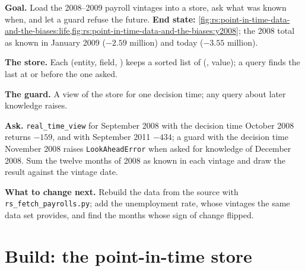\begin{tutorial}
\textbf{Goal.} Load the 2008--2009 payroll vintages into a  store, ask what was known when, and let a guard refuse
the future. \textbf{End state:} \cref{fig:rs:point-in-time-data-and-the-biases:life,fig:rs:point-in-time-data-and-the-biases:y2008};
the 2008 total as known in January 2009 ($-2.59$ million) and today ($-3.55$ million).
\begin{tutsteps}
\item \textbf{The store.} Each (entity, field, ) keeps a sorted list of (, value); a query finds the
last  at or before the one asked.
\label{lst:rs:point-in-time-data-and-the-biases:store}
\item \textbf{The guard.} A view of the store for one decision time; any query about later knowledge raises.
\label{lst:rs:point-in-time-data-and-the-biases:guard}
\item \textbf{Ask.} \texttt{real\_time\_view} for September 2008 with the decision time October 2008 returns $-159$, and with
September 2011 $-434$; a guard with the decision time November 2008 raises \texttt{LookAheadError} when asked for knowledge of
December 2008. Sum the twelve months of 2008 as known in each vintage and draw the result against the vintage date.
\end{tutsteps}
\textbf{What to change next.} Rebuild the data from the source with \texttt{rs\_fetch\_payrolls.py}; add the unemployment rate,
whose vintages the same data set provides, and find the months whose sign of change flipped.
\end{tutorial}

\section{Build: the point-in-time store}\label{bld:rs:point-in-time-data-and-the-biases:pit}

